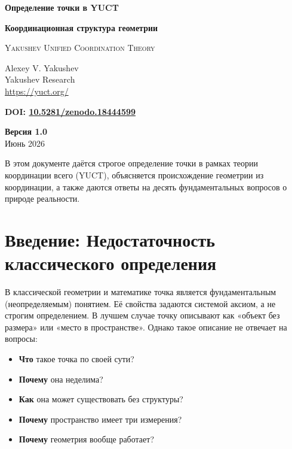 \documentclass[12pt,a4paper]{article}
\begin{document}
	
	\begin{titlepage}
		\begin{center}
			\vspace*{1.5cm}
			\Huge\textbf{Определение точки в YUCT}
			
			\vspace{0.3cm}
			\Large\textbf{Координационная структура геометрии}
			
			\vspace{0.5cm}
			\large
			\textsc{Yakushev Unified Coordination Theory}
			
			\vspace{0.8cm}
			\large
			Alexey V. Yakushev \\
			Yakushev Research \\
			\url{https://yuct.org/}
			
			\vspace{0.5cm}
			\large
			\textbf{DOI: \href{https://doi.org/10.5281/zenodo.18444599}{10.5281/zenodo.18444599}}
			
			\vspace{1.5cm}
			\large
			\textbf{Версия 1.0} \\
			Июнь 2026
			
			\vfill
			\normalsize
			В этом документе даётся строгое определение точки в рамках теории координации всего (YUCT),
			объясняется происхождение геометрии из координации, а также даются ответы на десять фундаментальных вопросов
			о природе реальности.
		\end{center}
	\end{titlepage}
	
	\tableofcontents
	\newpage
	
	\section{Введение: Недостаточность классического определения}
	
	В классической геометрии и математике точка является фундаментальным (неопределяемым) понятием. Её свойства задаются системой аксиом, а не строгим определением. В лучшем случае точку описывают как «объект без размера» или «место в пространстве». Однако такое описание не отвечает на вопросы:
	
	\begin{itemize}
		\item \textbf{Что} такое точка по своей сути?
		\item \textbf{Почему} она неделима?
		\item \textbf{Как} она может существовать без структуры?
		\item \textbf{Почему} пространство имеет три измерения?
		\item \textbf{Почему} геометрия вообще работает?
	\end{itemize}
	
\end{document}
